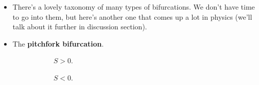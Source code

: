 \documentclass[../notes.tex]{subfiles}
\begin{document}
\begin{itemize}
\begin{figure}[h!]
\begin{subfigure}[b]{0.3\linewidth}
            \caption{Bifurcation diagram.}
            \label{fig:bifurSaddleNoded}
        \end{subfigure}
        \caption{Saddle-node bifurcation.}
        \label{fig:bifurSaddleNode}
    \end{figure}
    \begin{itemize}
        \item One-dimensional example: Consider $\dot{x}=r+x^2$.
        \item As $r$ varies from negative to zero to postive, we get the Figure \ref{fig:bifurSaddleNodea}-\ref{fig:bifurSaddleNodec}. First two fixed points, then one, then none.
        \item A \textbf{bifurcation diagram} plots $r$ vs. the $x$-position of the fixed points, stable ones with solid lines and unstable ones with dotted lines. See Figure \ref{fig:bifurSaddleNoded}.
    \end{itemize}
    \item There's a lovely taxonomy of many types of bifurcations. We don't have time to go into them, but here's another one that comes up a lot in physics (we'll talk about it further in discussion section).
    \item The \textbf{pitchfork bifurcation}.
    \begin{figure}[h!]
        \centering
        \begin{subfigure}[b]{0.2\linewidth}
            \centering
            \caption{$S>0$.}
            \label{fig:bifurPitchforka}
        \end{subfigure}
        \begin{subfigure}[b]{0.2\linewidth}
            \centering
            \caption{$S<0$.}
            \label{fig:bifurPitchforkb}
        \end{subfigure}\\[1em]
        \begin{subfigure}[b]{0.3\linewidth}
            \centering
\end{subfigure}
\end{figure}
\end{itemize}
\end{document}
